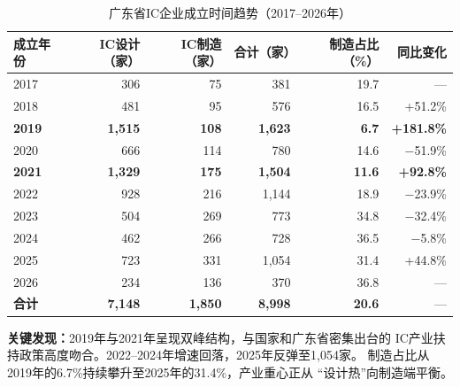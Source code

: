 \documentclass[12pt,a4paper]{ctexart}
\newcommand{\tableHeaderRow}{\rowcolor{tealPrimary}\color{white}}
\newcommand{\tableOddRow}{\rowcolor{mintBG}}
\newcommand{\tableEvenRow}{\rowcolor{white}}
\begin{document}
\begin{table}[H]
\centering
\caption{广东省IC企业成立时间趋势（2017--2026年）}
\label{tab:established}
\begin{tabular}{lrrrrr}
\toprule
\tableHeaderRow
\textbf{成立年份} & \textbf{IC设计（家）} & \textbf{IC制造（家）} & \textbf{合计（家）} & \textbf{制造占比（\%）} & \textbf{同比变化} \\
\midrule
\tableOddRow  2017 & 306 & 75  & 381  & 19.7 & —     \\
\tableEvenRow 2018 & 481 & 95  & 576  & 16.5 & +51.2\% \\
\tableOddRow  \textbf{2019} & \textbf{1,515} & \textbf{108} & \textbf{1,623} & \textbf{6.7} & \textbf{+181.8\%} \\
\tableEvenRow 2020 & 666 & 114 & 780  & 14.6 & $-$51.9\% \\
\tableOddRow  \textbf{2021} & \textbf{1,329} & \textbf{175} & \textbf{1,504} & \textbf{11.6} & \textbf{+92.8\%} \\
\tableEvenRow 2022 & 928 & 216 & 1,144 & 18.9 & $-$23.9\% \\
\tableOddRow  2023 & 504 & 269 & 773  & 34.8 & $-$32.4\% \\
\tableEvenRow 2024 & 462 & 266 & 728  & 36.5 & $-$5.8\%  \\
\tableOddRow  2025 & 723 & 331 & 1,054 & 31.4 & +44.8\%  \\
\tableEvenRow 2026 & 234 & 136 & 370  & 36.8 & —       \\
\midrule
\tableOddRow  \textbf{合计} & \textbf{7,148} & \textbf{1,850} & \textbf{8,998} & \textbf{20.6} & — \\
\bottomrule
\end{tabular}
\end{table}

\textbf{关键发现：}2019年与2021年呈现双峰结构，与国家和广东省密集出台的
IC产业扶持政策高度吻合。2022--2024年增速回落，2025年反弹至1,054家。
制造占比从2019年的6.7\%持续攀升至2025年的31.4\%，产业重心正从
``设计热''向制造端平衡。
\end{document}
